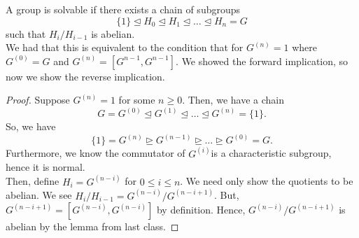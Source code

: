 \begin{recall}
	A group is solvable if there exists a chain of subgroups \[
	\{1\} \trianglelefteq H_0 \trianglelefteq H_1 \trianglelefteq \ldots \trianglelefteq H_{n} = G
	\]  such that \(H_{i} / H_{i - 1}\) is abelian.\\
	We had that this is equivalent to the condition that for \(G^{\left( n \right) } = 1\) where \(G^{\left( 0 \right) } = G\) and \(G^{\left( n \right) } = \left[ G^{n-1}, G^{n-1} \right] \). We showed the forward implication, so now we show the reverse implication.
\end{recall}
\begin{proof}
	Suppose \(G^{\left( n \right) } = 1\)	 for some \(n \ge 0\). Then, we have a chain \[
		G = G^{\left( 0 \right) } \trianglelefteq G^{\left( 1 \right) } \trianglelefteq \ldots \trianglelefteq G^{\left( n \right) } = \{1\}
	.\]
	So, we have
	\[
		\{1\}  = G^{\left( n \right) } \trianglerighteq G^{\left( n-1 \right) } \trianglerighteq \ldots \trianglerighteq G^{\left( 0 \right) } = G
	.\]
	Furthermore,  we know the commutator of \(G^{\left( i \right) }\)is a characteristic subgroup, hence it is normal.\\
	Then, define \(H_{i} = G^{\left( n - i \right) }\) for \(0 \le i \le n\). We need only show the quotients to be abelian. We see \(H_{i} / H_{i - 1} = G^{\left(n - i \right) } / G^{\left( n - i + 1 \right) }\). But, \(G^{\left( n - i + 1 \right) } = \left[ G^{\left( n-i \right) }, G^{\left( n-i \right) } \right] \) by definition. Hence, \(G^{\left( n - i \right) } / G^{\left( n - i + 1 \right) }\) is abelian by the lemma from last class.
\end{proof}
